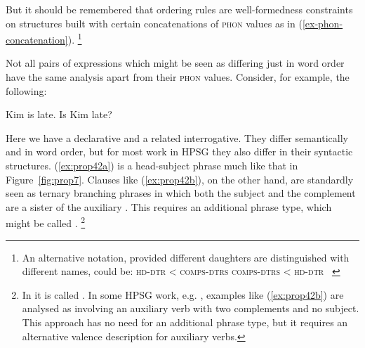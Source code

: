 \documentclass[output=paper
	        ,collection
	        ,collectionchapter
 	        ,biblatex
                ,babelshorthands
                ,newtxmath
                ,draftmode
                ,colorlinks, citecolor=brown
]{langscibook}
\begin{document}
\eal\label{ex:prop41}
\ex\label{ex:prop41a}
\ex\label{ex:prop41b}
\zl
%
But it should be remembered that ordering rules are well-formedness constraints on structures built with certain concatenations of \textsc{phon} values as in (\ref{ex-phon-concatenation}).%
%
\footnote{An alternative notation, provided different daughters are distinguished with different names, could be:
\eal
\ex \textsc{hd-dtr} < \textsc{comps-dtrs}
\ex \textsc{comps-dtrs} < \textsc{hd-dtr}
\zllast
~\newline{}
}
%

Not all pairs of expressions which might be seen as differing just in word order have the same analysis apart from their \textsc{phon} values. Consider, for example, the following:

\eal\label{ex:prop42}
\ex\label{ex:prop42a}
Kim is late.
\ex\label{ex:prop42b}
Is Kim late?
\zl

\noindent
Here we have a declarative and a related interrogative. They differ semantically and in word order, but for most work in HPSG they also differ in their syntactic structures. (\ref{ex:prop42a}) is a head-subject phrase much like that in Figure~\ref{fig:prop7}. Clauses like (\ref{ex:prop42b}), on the other hand, are standardly seen as ternary branching phrases in which both the subject and the complement are a sister of the auxiliary \citep[40]{ps2}. This requires an additional phrase type, which might be called .%
%
\footnote{In \citet[36]{GSag2000a-u} it is called . In some HPSG work, e.g. \citet[409--414]{SWB2003a}, examples like (\ref{ex:prop42b}) are analysed as involving an auxiliary verb with two complements and no subject. This approach has no need for an additional phrase type, but it requires an alternative valence description for auxiliary verbs.}
%
\end{document}
